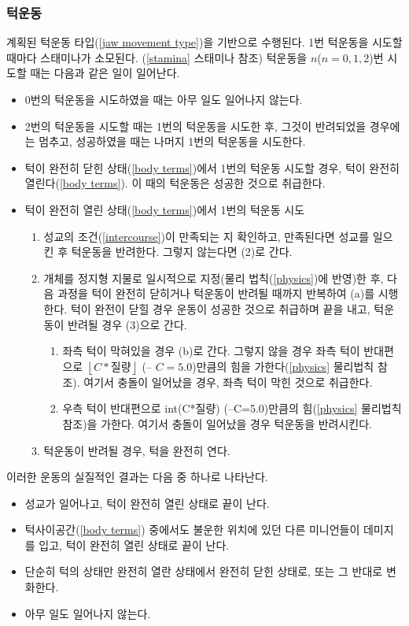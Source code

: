 \documentclass[a4paper,12pt]{article}
\newcommand{\floor}[1]{\left\lfloor{#1}\right\rfloor}
\begin{document}
\subsubsection{턱운동}\label{jaw movement}
계획된 턱운동 타입(\ref{jaw movement type})을 기반으로 수행된다. 
1번 턱운동을 시도할 때마다 스태미나가 소모된다. (\ref{stamina} 스태미나 참조)  
턱운동을 $n$($n=0,1,2$)번 시도할 때는 다음과 같은 일이 일어난다. 
\begin{itemize}
\item 0번의 턱운동을 시도하였을 때는 아무 일도 일어나지 않는다. 
\item 2번의 턱운동을 시도할 때는 1번의 턱운동을 시도한 후, 그것이 반려되었을 경우에는 멈추고, 성공하였을 때는 나머지 1번의 턱운동을 시도한다.
\item 턱이 완전히 닫힌 상태(\ref{body terms})에서 1번의 턱운동 시도할 경우, 턱이 완전히 열린다(\ref{body terms}). 이 때의 턱운동은 성공한 것으로 취급한다.  
\item 턱이 완전히 열린 상태(\ref{body terms})에서 1번의 턱운동 시도 
\begin{enumerate}
\item 성교의 조건(\ref{intercourse})이 만족되는 지 확인하고, 만족된다면 성교를 일으킨 후 턱운동을 반려한다. 그렇지 않는다면 (2)로 간다.
\item 개체를 정지형 지물로 일시적으로 지정(물리 법칙(\ref{physics})에 반영)한 후, 다음 과정을 턱이 완전히 닫히거나 턱운동이 반려될 때까지 반복하여 (a)를 시행한다. 턱이 완전이 닫힐 경우 운동이 성공한 것으로 취급하며 끝을 내고, 턱운동이 반려될 경우 (3)으로 간다. 
\begin{enumerate}
\item 좌측 턱이 막혀있을 경우 (b)로 간다. 그렇지 않을 경우 좌측 턱이 반대편으로 $\floor{C*\text{질량}}$ (-- $C=5.0$)만큼의 힘을 가한다(\ref{physics} 물리법칙 참조). 여기서 충돌이 일어났을 경우, 좌측 턱이 막힌 것으로 취급한다. 
\item 우측 턱이 반대편으로 int(C*질량) (--C=5.0)만큼의 힘(\ref{physics} 물리법칙 참조)을 가한다. 여기서 충돌이 일어났을 경우 턱운동을 반려시킨다.  
\end{enumerate}
\item 턱운동이 반려될 경우, 턱을 완전히 연다. 
\end{enumerate} 
\end{itemize}
이러한 운동의 실질적인 결과는 다음 중 하나로 나타난다.
\begin{itemize}
\item 성교가 일어나고, 턱이 완전히 열린 상태로 끝이 난다.
\item 턱사이공간(\ref{body terms}) 중에서도 불운한 위치에 있던 다른 미니언들이 데미지를 입고, 턱이 완전히 열린 상태로 끝이 난다. 
\item 단순히 턱의 상태만 완전히 열란 상태에서 완전히 닫힌 상태로, 또는 그 반대로 변화한다. 
\item 아무 일도 일어나지 않는다.
\end{itemize}
\end{document}
